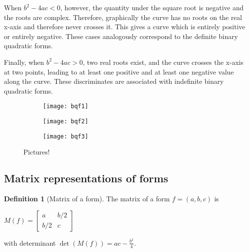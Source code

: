 \documentclass{article}
\theoremstyle{definition}
\newtheorem{definition}{Definition}[section]
\theoremstyle{theorem}
\theoremstyle{example}
\theoremstyle{corollary}
\begin{document}
\bigskip

When \(b^{2} - 4ac < 0\), however, the quantity under the square root is negative and the roots are complex. Therefore, graphically the curve has no roots on the real x-axis and therefore never crosses it. This gives a curve which is entirely positive or entirely negative. These cases analogously correspond to the definite binary quadratic forms.

\bigskip

Finally, when \(b^{2} - 4ac > 0\), two real roots exist, and the curve crosses the x-axis at two points, leading to at least one positive and at least one negative value along the curve. These discriminates are associated with indefinite binary quadratic forms.

\bigskip

\begin{figure}[H]
    \centering
    \begin{subfigure}
        \centering
        \texttt{[image: bqf1]}
    \end{subfigure}
    \begin{subfigure}
        \centering
        \texttt{[image: bqf2]}
    \end{subfigure}
    \begin{subfigure}
        \centering
        \texttt{[image: bqf3]}
    \end{subfigure}    
    \caption{Pictures!}
\end{figure}







\bigskip

\subsection{Matrix representations of forms}

\bigskip

\theoremstyle{definition}
\begin{definition}[Matrix of a form]
The matrix of a form \(f = (a, b, c)\) is
\begin{center}
\(M(f) = \begin{bmatrix} a & b/2 \\ b/2 & c \end{bmatrix}\)
\end{center}
with determinant \(\det(M(f)) = ac - \frac{b^{2}}{4}\).
\end{definition}
\end{document}
